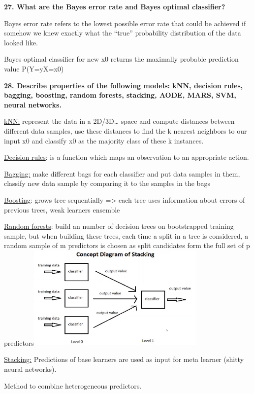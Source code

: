 \textbf{27. What are the Bayes error rate and Bayes optimal classifier?}

Bayes error rate refers to the lowest possible error rate that could be
achieved if somehow we knew exactly what the ``true'' probability
distribution of the data looked like.

Bayes optimal classifier for new x0 returns the maximally probable
prediction value P(Y=y\textbar X=x0)

\textbf{28. Describe properties of the following models: kNN, decision
rules, bagging, boosting, random forests, stacking, AODE, MARS, SVM,
neural networks.}

\underline{kNN:} represent the data in a 2D/3D\ldots{} space and compute
distances between different data samples, use these distances to find
the k nearest neighbors to our input x0 and classify x0 as the majority
class of these k instances.

\underline{Decision rules}: is a function which maps an observation to
an appropriate action.

\underline{Bagging:} make different bags for each classifier and put
data samples in them, classify new data sample by comparing it to the
samples in the bags

\underline{Boosting}: grows tree sequentially =\textgreater{} each tree
uses information about errors of previous trees, weak learners ensemble

\underline{Random forests}: build an number of decision trees on
bootstrapped training sample, but when building these trees, each time a
split in a tree is considered, a random sample of m predictors is chosen
as split candidates form the full set of p
predictors\includegraphics[width=3.42406in,height=2.00895in]{media/image35.png}

\underline{Stacking:} Predictions of base learners are used as input for
meta learner (shitty neural networks).

Method to combine heterogeneous predictors.

